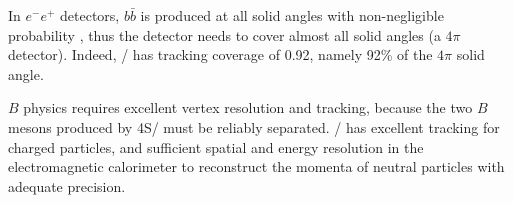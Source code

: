 In $e^- e^+$ detectors, $b \bar{b}$ is produced at all solid angles with
non-negligible probability \cite{Boutigny:1995ib,McGregor:2008ek}, thus the
detector needs to cover almost all solid angles (a $4\pi$ detector).
Indeed, \BaBar/ has tracking coverage of 0.92, namely 92\% of the $4\pi$ solid
angle.

$B$ physics requires excellent vertex resolution and tracking, because the two
$B$ mesons produced by \Y4S/ must be reliably separated.
\BaBar/ has excellent tracking for charged particles, and sufficient spatial
and energy resolution in the electromagnetic calorimeter to reconstruct the
momenta of neutral particles \cite{Bauer:2005} with adequate precision.
